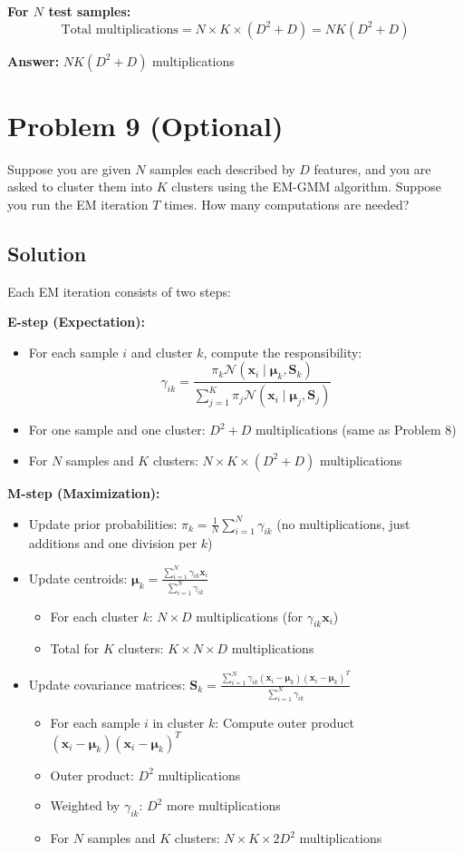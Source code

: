 \documentclass[11pt]{article}
\newcommand{\xbf}{\mathbf{x}}
\newcommand{\Sbf}{\mathbf{S}}
\def\mubf{{\boldsymbol \mu}}
\begin{document}
\textbf{For $N$ test samples:}
\[
\text{Total multiplications} = N \times K \times (D^2 + D) = NK(D^2 + D)
\]

\textbf{Answer:} $NK(D^2 + D)$ multiplications

\newpage

\section*{Problem 9 (Optional)}

Suppose you are given $N$ samples each described by $D$ features, and you are asked to cluster them into $K$ clusters using the EM-GMM algorithm. Suppose you run the EM iteration $T$ times. How many computations are needed?

\subsection*{Solution}

Each EM iteration consists of two steps:

\textbf{E-step (Expectation):}
\begin{itemize}
\item For each sample $i$ and cluster $k$, compute the responsibility:
  \[
  \gamma_{ik} = \frac{\pi_k \mathcal{N}(\xbf_i \mid \mubf_k, \Sbf_k)}{\sum_{j=1}^K \pi_j \mathcal{N}(\xbf_i \mid \mubf_j, \Sbf_j)}
  \]
\item For one sample and one cluster: $D^2 + D$ multiplications (same as Problem 8)
\item For $N$ samples and $K$ clusters: $N \times K \times (D^2 + D)$ multiplications
\end{itemize}

\textbf{M-step (Maximization):}
\begin{itemize}
\item Update prior probabilities: $\pi_k = \frac{1}{N}\sum_{i=1}^N \gamma_{ik}$ (no multiplications, just additions and one division per $k$)
\item Update centroids: $\mubf_k = \frac{\sum_{i=1}^N \gamma_{ik} \xbf_i}{\sum_{i=1}^N \gamma_{ik}}$
  \begin{itemize}
  \item For each cluster $k$: $N \times D$ multiplications (for $\gamma_{ik} \xbf_i$)
  \item Total for $K$ clusters: $K \times N \times D$ multiplications
  \end{itemize}
\item Update covariance matrices: $\Sbf_k = \frac{\sum_{i=1}^N \gamma_{ik} (\xbf_i - \mubf_k)(\xbf_i - \mubf_k)^T}{\sum_{i=1}^N \gamma_{ik}}$
  \begin{itemize}
  \item For each sample $i$ in cluster $k$: Compute outer product $(\xbf_i - \mubf_k)(\xbf_i - \mubf_k)^T$
  \item Outer product: $D^2$ multiplications
  \item Weighted by $\gamma_{ik}$: $D^2$ more multiplications
  \item For $N$ samples and $K$ clusters: $N \times K \times 2D^2$ multiplications
  \end{itemize}
\end{itemize}
\end{document}
